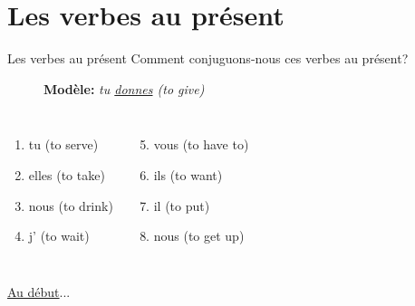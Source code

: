 \documentclass{beamer}
\begin{document}
  \section{Les verbes au présent}
    \begin{frame}{Les verbes au présent}
      Comment conjuguons-nous ces verbes au présent?
      \begin{description}
        \item[] \textbf{Modèle:} \emph{tu \underline{donnes} (to give)}
      \end{description}
      \begin{columns}
          \begin{enumerate}
            \item tu \underline{} (to serve)
            \item elles \underline{} (to take)
            \item nous \underline{} (to drink)
            \item j' \underline{} (to wait)
          \end{enumerate}
          \begin{enumerate}
            \setcounter{enumi}{4}
            \item vous \underline{} (to have to)
            \item ils \underline{} (to want)
            \item il \underline{} (to put)
            \item nous \underline{} (to get up)
          \end{enumerate}
      \end{columns}
      \vspace{0.5cm}
      \hyperlink{début}{Au début}...
    \end{frame}
\end{document}
